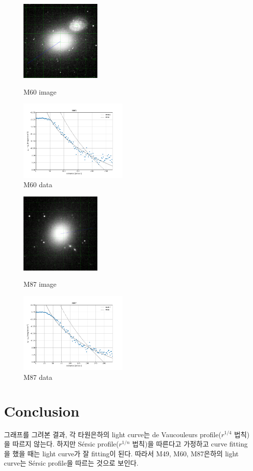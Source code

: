 \documentclass{article}
\begin{document}
\begin{figure}[H]
    \centering
    \begin{minipage}{0.45\textwidth}
        \centering
        \includegraphics[height=4cm]{figures/M60_image.png} 
        \caption{M60 image}
        \label{fig:M60 image}
    \end{minipage}
    \hfill
    \begin{minipage}{0.45\textwidth}
        \centering
        \includegraphics[height=4cm]{figures/M60_mu.png}
        \caption{M60 data}
        \label{fig:M60 data}
    \end{minipage}
\end{figure}

\begin{figure}[H]
    \centering
    \begin{minipage}{0.45\textwidth}
        \centering
        \includegraphics[height=4cm]{figures/M87_image.png} 
        \caption{M87 image}
        \label{fig:M87 image}
    \end{minipage}
    \hfill
    \begin{minipage}{0.45\textwidth}
        \centering
        \includegraphics[height=4cm]{figures/M87_mu.png}
        \caption{M87 data}
        \label{fig:M87 data}
    \end{minipage}
\end{figure}

\section{Conclusion}
\quad 그래프를 그려본 결과, 각 타원은하의 light curve는 de Vaucouleurs profile($r^{1/4}$ 법칙)을 따르지 않는다. 
하지만 Sérsic profile($r^{1/n}$ 법칙)을 따른다고 가정하고 curve fitting을 했을 때는 light curve가 잘 fitting이 된다.
따라서 M49, M60, M87은하의 light curve는 Sérsic profile을 따르는 것으로 보인다.
\end{document}
